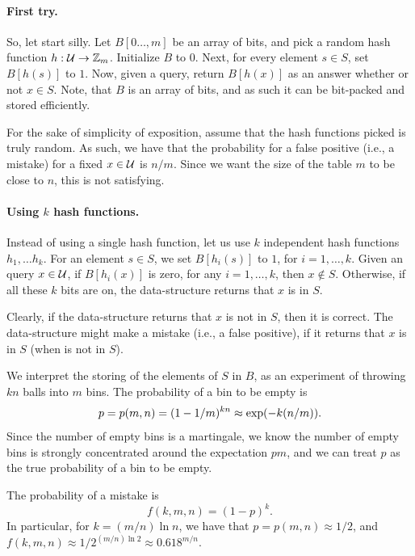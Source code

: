 \paragraph*{First try.}
So, let start silly. Let $B[0\ldots, m]$ be an array of bits, and pick
a random hash function $h:\mathcal{U} \rightarrow \mathbb{Z}_m$. Initialize $B$ to
$0$. Next, for every element $s \in S$, set $B[h(s)]$ to $1$. Now,
given a query, return $B[h(x)]$ as an answer whether or not $x \in
S$. Note, that $B$ is an array of bits, and as such it can be
bit-packed and stored efficiently.

For the sake of simplicity of exposition, assume that the hash
functions picked is truly random. As such, we have that the
probability for a false positive (i.e., a mistake) for a fixed
$x \in \mathcal{U}$ is $n/m$. Since we want the size of the table $m$ to be
close to $n$, this is not satisfying.


\paragraph*{Using $k$ hash functions.}
Instead of using a single hash function, let us use $k$ independent
hash functions $h_1, \ldots h_k$. For an element $s \in S$, we set
$B[h_i(s)]$ to $1$, for $i=1,\ldots, k$.  Given an query $x \in \mathcal{U}$,
if $B[h_i(x)]$ is zero, for any $i=1,\ldots, k$, then $x \notin
S$. Otherwise, if all these $k$ bits are on, the data-structure
returns that $x$ is in $S$.


Clearly, if the data-structure returns that $x$ is not in $S$, then it
is correct. The data-structure might make a mistake (i.e., a false
positive), if it returns that $x$ is in $S$ (when is not in $S$).

We interpret the storing of the elements of $S$ in $B$, as an
experiment of throwing $kn$ balls into $m$ bins. The probability of a
bin to be empty is
\begin{equation*}
    p = p(m,n) = (1-1/m)^{kn} \approx \exp \pth{-k(n/m)}.
\end{equation*}
Since the number of empty bins is a martingale, we know the number of
empty bins is strongly concentrated around the expectation $p m$, and
we can treat $p$ as the true probability of a bin to be empty.

The probability of a mistake is
\begin{equation*}
    f(k,m,n) = (1-p)^k.
\end{equation*}
In particular, for $k = (m/n)\ln n$, we have that
$p = p(m,n) \approx 1/2$, and
$f(k,m,n) \approx 1/2^{(m/n)\ln 2} \approx 0.618^{m/n}$.

